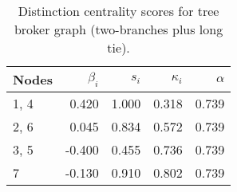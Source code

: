 \begin{table}
\centering
\caption{\label{tab:treelong2}Distinction centrality scores for tree broker graph (two-branches plus long tie).}
\centering
\begin{tabular}[t]{lrrrr}
\toprule
Nodes & $\beta_i$ & $s_i$ & $\kappa_i$ & $\alpha$\\
\midrule
1, 4 & 0.420 & 1.000 & 0.318 & 0.739\\
2, 6 & 0.045 & 0.834 & 0.572 & 0.739\\
3, 5 & -0.400 & 0.455 & 0.736 & 0.739\\
7 & -0.130 & 0.910 & 0.802 & 0.739\\
\bottomrule
\end{tabular}
\end{table}
